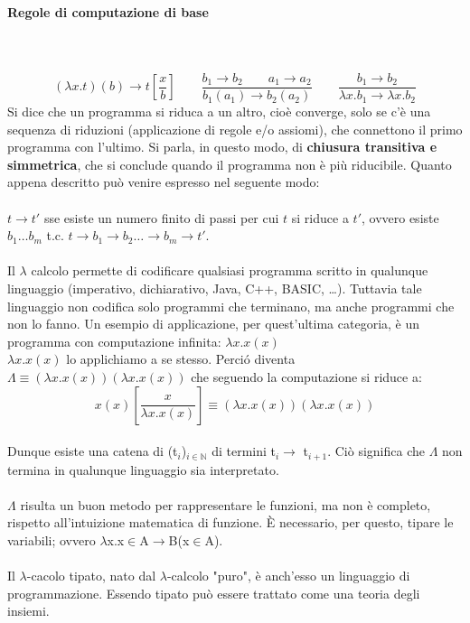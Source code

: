 \documentclass[10pt,a4paper, italian]{book}
\begin{document}
\paragraph{Regole di computazione di base}\mbox{}\\\\ 
\[ (\lambda x.t)(b) \rightarrow t[\frac{x}{b}] \qquad
\frac{b_1 \rightarrow b_2	\qquad a_1 \rightarrow a_2 }{b_1(a_1) \rightarrow b_2(a_2)} \qquad 
\frac{b_1 \rightarrow b_2}{\lambda x.b_1 \rightarrow \lambda x.b_2} \]
\noindent
Si dice che un programma si riduca a un altro, cio\`e converge, solo se c'\`e una sequenza di riduzioni (applicazione di regole e/o assiomi), che connettono il primo programma con l'ultimo. Si parla, in questo modo, di \textbf{chiusura transitiva e simmetrica}, che si conclude quando il programma non \`e pi\`u riducibile. Quanto appena descritto pu\`o venire espresso nel seguente modo:\\\\ $t \rightarrow t'$ sse esiste un numero finito di passi per cui $t$ si riduce a $t'$, ovvero esiste $b_1 \dots b_m$ t.c. $t \rightarrow b_1 \rightarrow b_2 \dots \rightarrow b_m \rightarrow t'$.\\\\
Il $\lambda$ calcolo permette di codificare qualsiasi programma scritto in qualunque linguaggio (imperativo, dichiarativo, Java, C++, BASIC, \dots). Tuttavia tale linguaggio non codifica solo programmi che terminano, ma anche programmi che non lo fanno.
Un esempio di applicazione, per quest'ultima categoria, \`e un programma con computazione infinita: $\lambda x.x(x)$\\
$\lambda x.x(x)$ lo applichiamo a se stesso. Perci\'o diventa $\Lambda \equiv (\lambda x.x(x))(\lambda x.x(x))$
che seguendo la computazione si riduce a: \[x(x)[\frac{x}{\lambda x.x(x)}] \equiv (\lambda x.x(x))(\lambda x.x(x))\]\\
Dunque esiste una catena di (t$_i$)$_{i\in\mathbb{N}}$ di termini t$_i \rightarrow$ t$_{i+1}$. Ci\`o significa che
$\Lambda$ non termina in qualunque linguaggio sia interpretato.\\\\
$\Lambda$ risulta un buon metodo per rappresentare le funzioni, ma non \`e completo, rispetto all'intuizione matematica di funzione. \`E necessario, per questo, tipare le variabili; ovvero $\lambda$x.x$\in$A$\rightarrow$B(x$\in$A).\\\\
Il $\lambda$-cacolo tipato, nato dal $\lambda$-calcolo "puro", \`e anch'esso un linguaggio di programmazione. Essendo tipato pu\`o essere trattato come una teoria degli insiemi.
\end{document}
